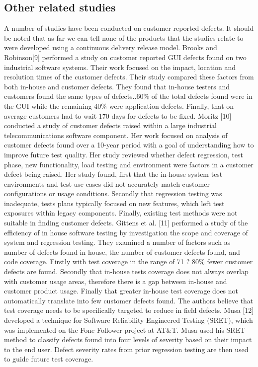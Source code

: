 \documentclass[conference]{IEEEtran}
\begin{document}
\subsection{Other related studies}
A number of studies have been conducted on customer reported defects. It should be noted that as far we can tell none of the products that the studies relate to were developed using a continuous delivery release model. 
Brooks and Robinson[9] performed a study on customer reported GUI defects found on two industrial software systems. Their work focused on the impact, location and resolution times of the customer defects. Their study compared these factors from both in-house and customer defects. They found that in-house testers and customers found the same types of defects..60\% of the total defects found were in the GUI while the remaining 40\% were application defects. Finally, that on average customers had to wait 170 days for defects to be fixed.
Moritz [10] conducted a study of customer defects raised within a large industrial telecommunications software component. Her work focused on analysis of customer defects found over a 10-year period with a goal of understanding how to improve future test quality. Her study reviewed whether defect regression, test phase, new functionality, load testing and environment were factors in a customer defect being raised. Her study found, first that the in-house system test environments and test use cases did not accurately match customer configurations or usage conditions. Secondly that regression testing was inadequate, tests plans typically focused on new features,  which left test exposures within legacy components. Finally, existing test methods were not suitable in finding customer defects. 
 Gittens et al. [11] performed a study of the efficiency of in house software testing by investigation the scope and coverage of system and regression testing. They examined a number of factors such as number of defects found in house, the number of customer defects found, and code coverage. Firstly with test coverage in the range of 71 ? 80\% fewer customer defects are found. Secondly that in-house tests coverage does not always overlap with customer usage areas, therefore there is a gap between in-house and customer product usage. Finally that greater in-house test coverage does not automatically translate into few customer defects found. The authors believe that test coverage needs to be specifically targeted to reduce in field defects.
Musa [12] developed a technique for Software Reliability Engineered Testing (SRET), which was implemented on the Fone Follower project at AT\&T. Musa used his SRET method to classify defects found into four levels of severity based on their impact to the end user. Defect severity rates from prior regression testing are then used to guide future test coverage. 
\end{document}
